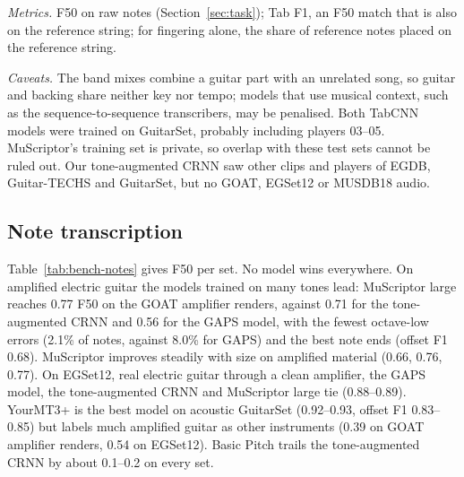 \emph{Metrics.} F50 on raw notes (Section~\ref{sec:task}); Tab F1, an F50
match that is also on the reference string; for fingering alone, the share of
reference notes placed on the reference string.

\emph{Caveats.} The band mixes combine a guitar part with an unrelated song,
so guitar and backing share neither key nor tempo; models that use musical
context, such as the sequence-to-sequence transcribers, may be penalised.
Both TabCNN models were trained on GuitarSet, probably including players
03--05. MuScriptor's training set is private, so overlap with these test sets
cannot be ruled out. Our tone-augmented CRNN saw other clips and players of
EGDB, Guitar-TECHS and GuitarSet, but no GOAT, EGSet12 or MUSDB18 audio.

\subsection{Note transcription}
Table~\ref{tab:bench-notes} gives F50 per set. No model wins everywhere.
On amplified electric guitar the models trained on many tones lead:
MuScriptor large reaches 0.77 F50 on the GOAT amplifier renders, against 0.71
for the tone-augmented CRNN and 0.56 for the GAPS model, with the fewest
octave-low errors (2.1\% of notes, against 8.0\% for GAPS) and the best note
ends (offset F1 0.68). MuScriptor improves steadily with size on amplified
material (0.66, 0.76, 0.77). On EGSet12, real electric guitar through a clean
amplifier, the GAPS model, the tone-augmented CRNN and MuScriptor large tie
(0.88--0.89). YourMT3+ is the best model on acoustic GuitarSet (0.92--0.93,
offset F1 0.83--0.85) but labels much amplified guitar as other instruments
(0.39 on GOAT amplifier renders, 0.54 on EGSet12). Basic Pitch trails the
tone-augmented CRNN by about 0.1--0.2 on every set.

